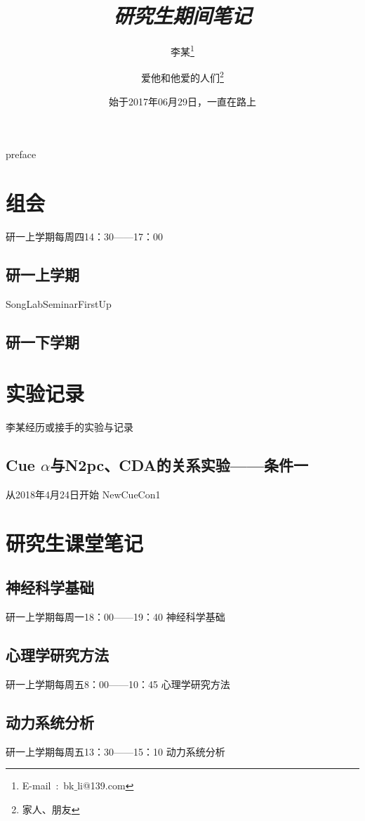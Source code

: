 \documentclass[12pt,a4paper]{book} %
\begin{document}
\frontmatter %
\title{\LARGE{\emph{\textbf{\kaishu 研究生期间笔记}}}} \author{李某\thanks{E-mail~:~bk$\_$li@139.com}\and 爱他和他爱的人们\thanks{家人、朋友}} \date{始于2017年06月29日，一直在路上}
\maketitle %
{preface} 
\tableofcontents
\mainmatter
\chapter{组会}
\indent 研一上学期每周四14：30——17：00
\section{研一上学期}
{SongLabSeminarFirstUp}
\section{研一下学期}
\chapter{实验记录}
\indent 李某经历或接手的实验与记录
\section{Cue $\alpha$与N2pc、CDA的关系实验——条件一}
\indent 从2018年4月24日开始
{NewCueCon1}
\chapter{研究生课堂笔记}
\section{神经科学基础}
\indent 研一上学期每周一18：00——19：40
{神经科学基础}
\section{心理学研究方法}
\indent 研一上学期每周五8：00——10：45
{心理学研究方法}
\section{动力系统分析}
\indent 研一上学期每周五13：30——15：10
{动力系统分析}
\end{document}
